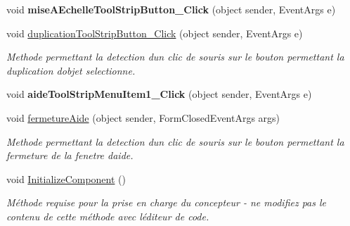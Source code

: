 \begin{DoxyCompactItemize}
void {\bfseries mise\+A\+Echelle\+Tool\+Strip\+Button\+\_\+\+Click} (object sender, Event\+Args e)
\item 
void \hyperlink{group__inf2990_ga29d7e098c3c84b9a395c10e3d7d1531f}{duplication\+Tool\+Strip\+Button\+\_\+\+Click} (object sender, Event\+Args e)
\begin{DoxyCompactList}\small\item\em Methode permettant la detection d\textquotesingle{}un clic de souris sur le bouton permettant la duplication d\textquotesingle{}objet selectionne. \end{DoxyCompactList}\item 
void {\bfseries aide\+Tool\+Strip\+Menu\+Item1\+\_\+\+Click} (object sender, Event\+Args e)
\item 
void \hyperlink{group__inf2990_ga26565a479fb2e1f927d835acae324821}{fermeture\+Aide} (object sender, Form\+Closed\+Event\+Args args)
\begin{DoxyCompactList}\small\item\em Methode permettant la detection d\textquotesingle{}un clic de souris sur le bouton permettant la fermeture de la fenetre d\textquotesingle{}aide. \end{DoxyCompactList}\item 
void \hyperlink{class_interface_graphique_1_1_edition_ade7bd8d972c69494b7cb99cb4d4be5d0}{Initialize\+Component} ()
\begin{DoxyCompactList}\small\item\em Méthode requise pour la prise en charge du concepteur -\/ ne modifiez pas le contenu de cette méthode avec l\textquotesingle{}éditeur de code. \end{DoxyCompactList}\end{DoxyCompactItemize}

